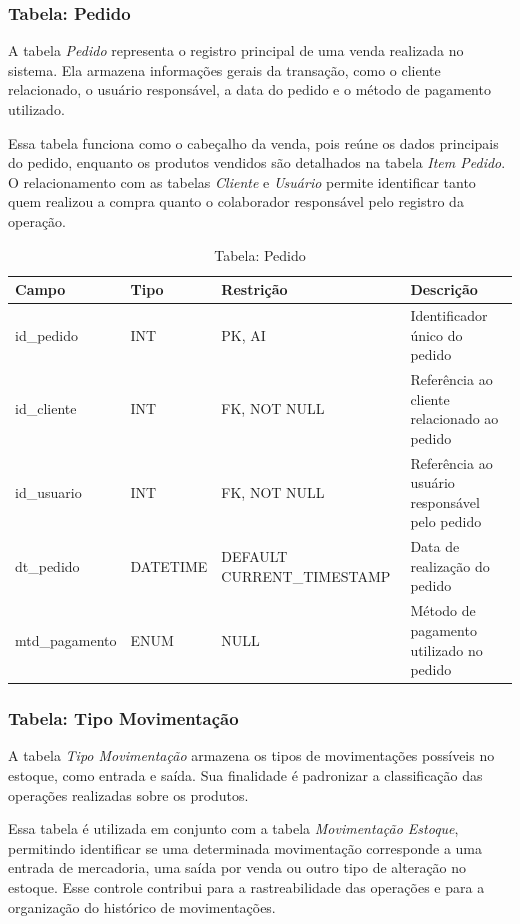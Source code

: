 \subsubsection{Tabela: Pedido}

A tabela \textit{Pedido} representa o registro principal de uma venda realizada no sistema. Ela armazena informações gerais da transação, como o cliente relacionado, o usuário responsável, a data do pedido e o método de pagamento utilizado.

Essa tabela funciona como o cabeçalho da venda, pois reúne os dados principais do pedido, enquanto os produtos vendidos são detalhados na tabela \textit{Item Pedido}. O relacionamento com as tabelas \textit{Cliente} e \textit{Usuário} permite identificar tanto quem realizou a compra quanto o colaborador responsável pelo registro da operação.

\begin{table}[H]
\centering
\begin{tabular}{|p{3cm}|p{3cm}|p{3cm}|p{5cm}|}
\hline
\textbf{Campo} & \textbf{Tipo} & \textbf{Restrição} & \textbf{Descrição} \\ \hline
id\_pedido & INT & PK, AI & Identificador único do pedido \\ \hline
id\_cliente & INT & FK, NOT NULL & Referência ao cliente relacionado ao pedido \\ \hline
id\_usuario & INT & FK, NOT NULL & Referência ao usuário responsável pelo pedido \\ \hline
dt\_pedido & DATETIME & DEFAULT CURRENT\_TIMESTAMP & Data de realização do pedido \\ \hline
mtd\_pagamento & ENUM & NULL & Método de pagamento utilizado no pedido \\ \hline
\end{tabular}
\caption{Tabela: Pedido}
\end{table}

\subsubsection{Tabela: Tipo Movimentação}

A tabela \textit{Tipo Movimentação} armazena os tipos de movimentações possíveis no estoque, como entrada e saída. Sua finalidade é padronizar a classificação das operações realizadas sobre os produtos.

Essa tabela é utilizada em conjunto com a tabela \textit{Movimentação Estoque}, permitindo identificar se uma determinada movimentação corresponde a uma entrada de mercadoria, uma saída por venda ou outro tipo de alteração no estoque. Esse controle contribui para a rastreabilidade das operações e para a organização do histórico de movimentações.

